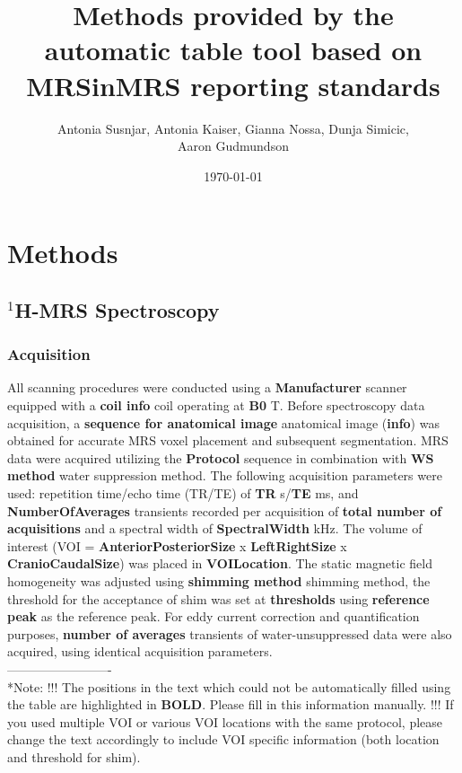 \documentclass{article}
\title{Methods provided by the automatic table tool based on MRSinMRS reporting standards}
\author{Antonia Susnjar, Antonia Kaiser, Gianna Nossa, Dunja Simicic, \\ Aaron Gudmundson}
\date{\today}
\begin{document}
\maketitle

\section{Methods}

\subsection{${}^{1}$H-MRS Spectroscopy}
\subsubsection{Acquisition}
All scanning procedures were conducted using a \textbf{Manufacturer} scanner equipped with a \textbf{coil info} coil operating at \textbf{B0} T. 
Before spectroscopy data acquisition, a \textbf{sequence for anatomical image} anatomical image (\textbf{info}) was obtained for accurate MRS voxel placement and subsequent segmentation. MRS data were acquired utilizing the \textbf{Protocol} sequence in combination with \textbf{WS method} water suppression method. The following acquisition parameters were used: repetition time/echo time (TR/TE) of \textbf{TR} s/\textbf{TE} ms, and \textbf{NumberOfAverages} transients recorded per acquisition of \textbf{total number of acquisitions} and a spectral width of \textbf{SpectralWidth} kHz. The volume of interest (VOI = \textbf{AnteriorPosteriorSize} x \textbf{LeftRightSize} x \textbf{CranioCaudalSize}) was placed in \textbf{VOILocation}. The static magnetic field homogeneity was adjusted using \textbf{shimming method} shimming method, the threshold for the acceptance of shim was set at \textbf{thresholds} using \textbf{reference peak} as the reference peak. 
For eddy current correction and quantification purposes, \textbf{number of averages}  transients of water-unsuppressed data were also acquired, using identical acquisition parameters.\\
-------------------------\\
*Note: 
!!! The positions in the text which could not be automatically filled using the table are highlighted in \textbf{BOLD}. Please fill in this information manually. 
!!! If you used multiple VOI or various VOI locations with the same protocol, please change the text accordingly to include VOI specific information (both location and threshold for shim).
\end{document}
